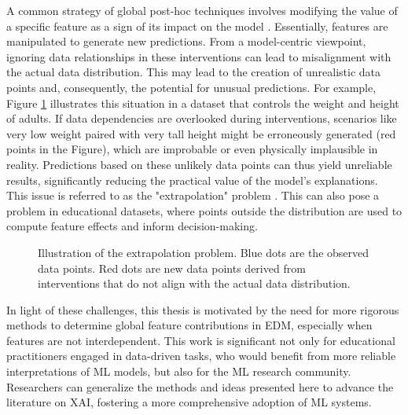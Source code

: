 A common strategy of global post-hoc techniques involves modifying the value of a specific feature as a sign of its impact on the model \cite{Scholbeck2020SamplingInterpretations}. Essentially, features are manipulated to generate new predictions. From a model-centric viewpoint, ignoring data relationships in these interventions can lead to misalignment with the actual data distribution. This may lead to the creation of unrealistic data points and, consequently, the potential for unusual predictions. For example, Figure \ref{fig:extrapolation_introduction} illustrates this situation in a dataset that controls the weight and height of adults.  If data dependencies are overlooked during interventions, scenarios like very low weight paired with very tall height might be erroneously generated (red points in the Figure), which are improbable or even physically implausible in reality. Predictions based on these unlikely data points can thus yield unreliable results, significantly reducing the practical value of the model's explanations. This issue is referred to as the "extrapolation" problem \cite{Molnar2022GeneralModels, Rudin2019StopInstead}. This can also pose a problem in educational datasets, where points outside the distribution are used to compute feature effects and inform decision-making. 

\begin{figure}[ht!]
\centering
  \caption{Illustration of the extrapolation problem. Blue dots are the observed data points. Red dots are new data points derived from interventions that do not align with the actual data distribution.}
    \label{fig:extrapolation_introduction}
\end{figure}

 
In light of these challenges, this thesis is motivated by the need for more rigorous methods to determine global feature contributions in \gls{EDM}, especially when features are not interdependent. This work is significant not only for educational practitioners engaged in data-driven tasks, who would benefit from more reliable interpretations of \gls{ML} models, but also for the ML research community. Researchers can generalize the methods and ideas presented here to advance the literature on \gls{XAI}, fostering a more comprehensive adoption of ML systems.

